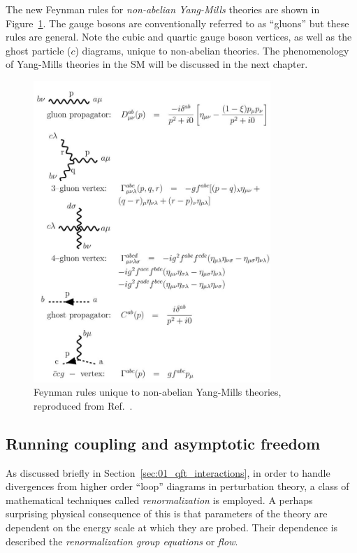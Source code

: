 The new Feynman rules for \textit{non-abelian Yang-Mills} theories are shown in Figure~\ref{fig:01_qft_gt_yangmills_feynman}.
The gauge bosons are conventionally referred to as ``gluons'' but these rules are general.
Note the cubic and quartic gauge boson vertices, as well as the ghost particle ($c$) diagrams, unique to non-abelian theories.
The phenomenology of Yang-Mills theories in the SM will be discussed in the next chapter.

\begin{figure}[ht!]
	\centering
	\includegraphics[width=0.8\textwidth]{figures/01-SM-02-QFT/Feynman/yangmills}
	\caption{Feynman rules unique to non-abelian Yang-Mills theories, reproduced from Ref.~\cite{enwiki:1243569653}.}
	\label{fig:01_qft_gt_yangmills_feynman}
\end{figure}


\subsection{Running coupling and asymptotic freedom}
\label{sec:01_qft_gt_asymptotic}

As discussed briefly in Section~\ref{sec:01_qft_interactions}, in order to handle divergences from higher order ``loop'' diagrams in perturbation theory, a class of mathematical techniques called \textit{renormalization} is employed.
A perhaps surprising physical consequence of this is that parameters of the theory are dependent on the energy scale at which they are probed.
Their dependence is described the \textit{renormalization group equations} or \textit{flow}.

